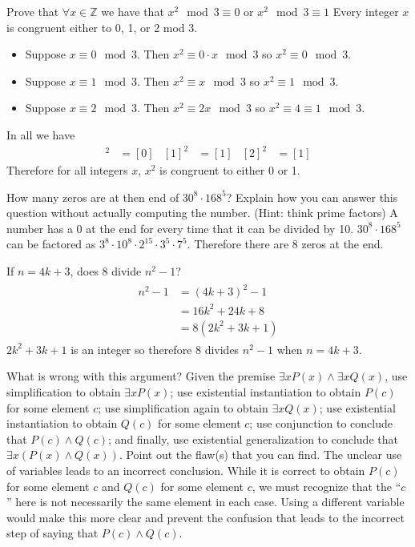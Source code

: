 \documentclass[paper=a4, fontsize=11pt]{jhwhw} %
\begin{document}
\problem{}
Prove that $\forall x \in \mathbb Z$ we have that $x^2 \mod{3} \equiv 0$ or $x^2 \mod{3} \equiv 1$
\solution
Every integer $x$ is congruent either to 0, 1, or 2 mod 3. 
\begin{itemize}
\item Suppose $x\equiv 0 \mod 3$. Then $x^2 \equiv 0\cdot x \mod 3$ so $x^2 \equiv 0 \mod 3$.
\item Suppose $x\equiv 1 \mod 3$. Then $x^2 \equiv x \mod 3$ so $x^2 \equiv 1 \mod 3$.
\item Suppose $x\equiv 2 \mod 3$. Then $x^2 \equiv 2x \mod 3$ so $x^2 \equiv 4 \equiv 1 \mod 3$.
\end{itemize}
In all we have
\begin{align}
[0]^2 &= [0] &[1]^2&=[1] &[2]^2 &= [1]
\end{align}
Therefore for all integers $x$, $x^2$ is congruent to either 0 or 1.

\problem{}
How many zeros are at then end of $30^8 \cdot 168^5$? Explain how you can answer this question without actually computing the number. (Hint: think prime factors)
\solution
A number has a 0 at the end for every time that it can be divided by 10. $30^8 \cdot 168^5$ can be factored as $3^8 \cdot 10^8 \cdot 2^{15} \cdot 3^5 \cdot 7^5$. Therefore there are 8 zeros at the end.

\problem{}
If $n=4k + 3$, does 8 divide $n^2-1$?
\solution
\begin{align}
\begin{split}
n^2 - 1 &= (4k + 3)^2 - 1\\
&= 16k^2 + 24k + 8\\
&= 8(2k^2 + 3k + 1)
\end{split}
\end{align}
$2k^2 + 3k + 1$ is an integer so therefore 8 divides $n^2-1$ when $n=4k+3$.

\problem{}
What is wrong with this argument? Given the premise $\exists x P(x) \land \exists x Q(x)$, use simplification to obtain $\exists x P(x)$; use existential instantiation to obtain $P(c)$ for some element $c$; use simplification again to obtain $\exists x Q(x)$; use existential instantiation to obtain $Q(c)$ for some element $c$; use conjunction to conclude that $P(c) \land Q(c)$; and finally, use existential generalization to conclude that $\exists x (P(x) \land Q(x))$. Point out the flaw(s) that you can find.
\solution
The unclear use of variables leads to an incorrect conclusion. While it is correct to obtain $P(c)$ for some element $c$ and $Q(c)$ for some element $c$, we must recognize that the ``$c$'' here is not necessarily the same element in each case. Using a different variable would make this more clear and prevent the confusion that leads to the incorrect step of saying that $P(c) \land Q(c)$.
\end{document}
